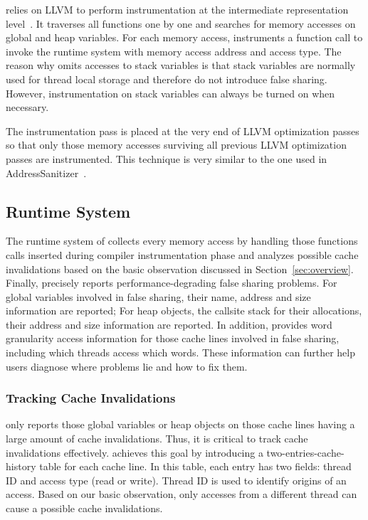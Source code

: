 \Predator{} relies on LLVM to perform instrumentation at the intermediate representation level~\cite{llvm}.
It traverses all functions one by one and 
searches for memory accesses on global and heap variables. 
For each memory access, \Predator{} instruments a function call to 
invoke the runtime system with memory access address and access type.
The reason why \Predator{} omits accesses to stack variables 
is that stack variables are normally used for thread local storage and
therefore do not introduce false sharing. However, instrumentation on stack
variables can always be turned on when necessary. 

The instrumentation pass is placed at the very end of LLVM optimization passes 
so that only those memory accesses surviving all previous 
LLVM optimization passes are instrumented. 
This  technique is very similar to the one used in AddressSanitizer~\cite{Addresssanitizer}.

\subsection{Runtime System}
\label{sec:runtime}
The runtime system of \Predator{} collects every memory access by handling 
those functions calls inserted during compiler instrumentation phase and analyzes
possible cache invalidations based on the basic observation discussed in Section~\ref{sec:overview}.
Finally, \Predator{} precisely reports performance-degrading false sharing problems.
For global variables involved in false sharing, their name, address and size
information are reported; For heap objects, the callsite stack for their allocations, 
their address and size information are reported.
In addition, \Predator{} provides word granularity access information for those cache lines 
involved in false sharing, including which threads access which words. 
These information can further help 
users diagnose where problems lie and how to fix them.

\subsubsection{Tracking Cache Invalidations}
\Predator{} only reports those global variables or heap objects on 
those cache lines having a large amount of cache invalidations. 
Thus, it is critical to track cache invalidations effectively. 
\Predator{} achieves this goal by introducing a  
two-entries-cache-history table for each cache line. 
In this table, each entry has two fields: thread ID and access type (read or write).
Thread ID is used to identify origins of an access. Based on our basic observation,
only accesses from a different thread can cause a possible cache invalidations. 

